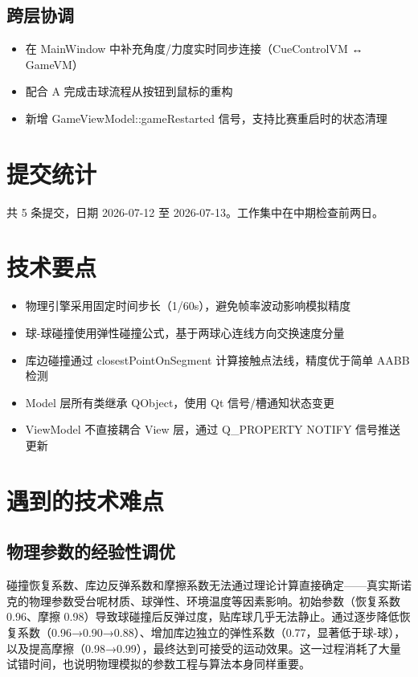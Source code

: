 \documentclass[11pt]{ctexart}
\begin{document}
\subsection{跨层协调}

\begin{itemize}
\item 在 MainWindow 中补充角度/力度实时同步连接（CueControlVM ↔ GameVM）
\item 配合 A 完成击球流程从按钮到鼠标的重构
\item 新增 GameViewModel::gameRestarted 信号，支持比赛重启时的状态清理
\end{itemize}

\section{提交统计}

共 5 条提交，日期 2026-07-12 至 2026-07-13。工作集中在中期检查前两日。

\section{技术要点}

\begin{itemize}
\item 物理引擎采用固定时间步长（1/60s），避免帧率波动影响模拟精度
\item 球-球碰撞使用弹性碰撞公式，基于两球心连线方向交换速度分量
\item 库边碰撞通过 closestPointOnSegment 计算接触点法线，精度优于简单 AABB 检测
\item Model 层所有类继承 QObject，使用 Qt 信号/槽通知状态变更
\item ViewModel 不直接耦合 View 层，通过 Q\_PROPERTY NOTIFY 信号推送更新
\end{itemize}

\section{遇到的技术难点}

\subsection{物理参数的经验性调优}

碰撞恢复系数、库边反弹系数和摩擦系数无法通过理论计算直接确定——真实斯诺克的物理参数受台呢材质、球弹性、环境温度等因素影响。初始参数（恢复系数 0.96、摩擦 0.98）导致球碰撞后反弹过度，贴库球几乎无法静止。通过逐步降低恢复系数（0.96→0.90→0.88）、增加库边独立的弹性系数（0.77，显著低于球-球），以及提高摩擦（0.98→0.99），最终达到可接受的运动效果。这一过程消耗了大量试错时间，也说明物理模拟的参数工程与算法本身同样重要。
\end{document}
